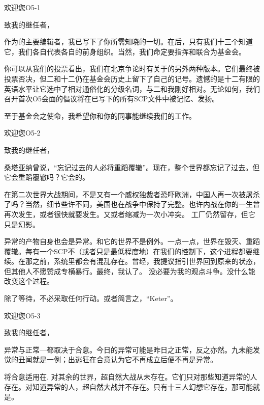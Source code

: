 \begin{whiteboxbb}

\begin{scpbox}

欢迎您O5-1

致我的继任者，

作为的主要编辑者，我已写下了你所需知晓的一切。在后，只有我们十三个知道它，我们各自代表各自的前身组织。当然，我们命定要指挥和联合为基金会。

你可以从我们的投票看出，我们在北京争论时有关于的另外两种版本。它们最终被投票否决，但二和十二仍在基金会历史上留下了自己的记号。遗憾的是十二有限的英语水平让它选中了相对通俗化的分级名词，与二和我刚好相对。无论如何，我们召开首次O5会面的倡议将在已写下的所有SCP文件中被记忆、发扬。

至于基金会之使命，我希望你和你的同事能继续我们的工作。

\end{scpbox}

\begin{scpbox}

欢迎您O5-2

致我的继任者，

桑塔亚纳曾说，“忘记过去的人必将重蹈覆辙”。现在，整个世界都忘记了过去。但它会重蹈覆辙吗？它会的。

在第二次世界大战期间，不是又有一个威权独裁者恐吓欧洲，中国人再一次被屠杀了吗？当然，细节些许不同，美国也在战争中保持了完整。也许内战在你的一生曾再次发生，或者很快就要发生。又或者缩减为一次小冲突。 工厂仍然留存，但它只是幻影。

异常的产物自身也会是异常。和它的世界不是例外。一点一点，世界在毁灭、重蹈覆辙。每有一个SCP不（或者只是最低程度地）在我们的控制下，这个进程都要继续。在那之前，系统里都会有混乱存在。曾经，我提议指引世界回到原来的状态，但其他人不愿赞成专横暴行。最终，我认了。 没必要为我的观点斗争。没什么能改变这个过程。

除了等待，不必采取任何行动。或者简言之，“Keter”。

\end{scpbox}

\begin{scpbox}

欢迎您O5-3

致我的继任者，

异常与正常—都取决于合意。今日的异常可能是昨日之正常，反之亦然。九未能发觉的丑闻就是一例；出逃狂在合意认为它不再成立后便不再是异常。

将合意适用在. 对其余的世界，超自然大战从未存在。它们只对那些知道异常的人存在。对知道异常的人，超自然大战并不存在。只有十三人幻想它存在，那可能就是。


\end{scpbox}
\end{whiteboxbb}
